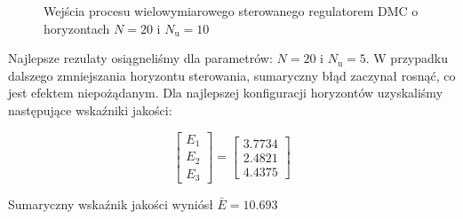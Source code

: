 \begin{figure}
    \begin{subfigure}[b]{\textwidth}
        \centering
    \end{subfigure}
    \caption{Wejścia procesu wielowymiarowego sterowanego regulatorem DMC o horyzontach $N = \num{20}$ i
    $N_{\mathrm{u}} = \num{10}$}
    \label{pro_dmc_2_in}
\end{figure}
\FloatBarrier

Najlepsze rezulaty osiągneliśmy dla parametrów: $N = \num{20}$ i
$N_{\mathrm{u}} = \num{5}$. W przypadku dalszego zmniejszania horyzontu sterowania, sumaryczny błąd
zaczynał rosnąć, co jest efektem niepożądanym. Dla najlepszej konfiguracji horyzontów uzyskaliśmy 
następujące wskaźniki jakości:

\[
\begin{bmatrix}
    E_{\mathrm{1}} \\
    E_{\mathrm{2}} \\
    E_{\mathrm{3}} 
\end{bmatrix}
= 
\begin{bmatrix}
    \num{3.7734} \\
    \num{2.4821} \\
    \num{4.4375}
\end{bmatrix}
\]

Sumaryczny wskaźnik jakości 
wyniósł $\bar{E} = \num{10.693}$\\


